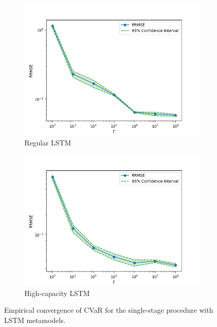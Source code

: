 \begin{figure}[ht!]
    \centering
    \begin{subfigure}{0.48\textwidth}
        \includegraphics[width=\textwidth]{./project2/figures/singleStage/MSEConvergence_lstmLoCap.png}
        \caption{Regular LSTM}
        \label{subfig2:convLoCap}
    \end{subfigure}
    \begin{subfigure}{0.48\textwidth}
        \includegraphics[width=\textwidth]{./project2/figures/singleStage/MSEConvergence_lstmHiCap.png}
        \caption{High-capacity LSTM}
        \label{subfig2:convHiCap}
    \end{subfigure}
    \caption{Empirical convergence of CVaR for the single-stage procedure with LSTM metamodels.} 
    \label{fig2:gammaConvergence}
\end{figure}


